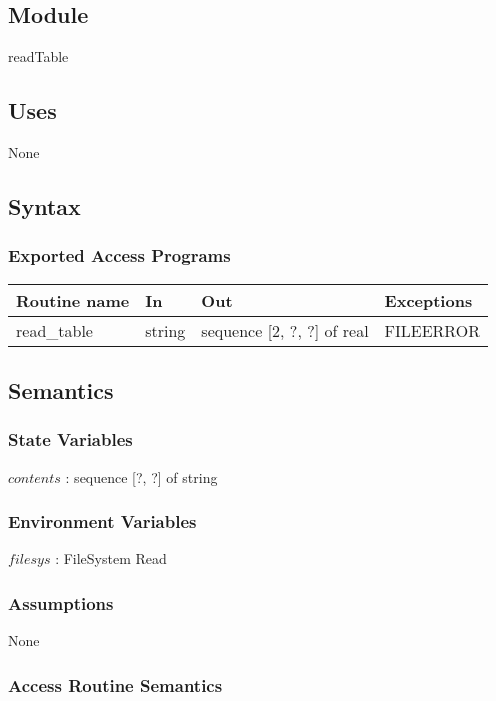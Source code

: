 \documentclass[12pt,fleqn]{article}
\begin{document}
\subsection*{Module}

readTable

\subsection* {Uses}

None

\subsection* {Syntax}

\subsubsection* {Exported Access Programs}

\begin{tabular}{| l | l | l | l |}
\hline
\textbf{Routine name} & \textbf{In} & \textbf{Out} & \textbf{Exceptions}\\
\hline
read\_table & string & sequence [2, ?, ?] of real & FILEERROR\\
\hline

\end{tabular}

\subsection* {Semantics}

\subsubsection* {State Variables}
$contents$ : sequence [?, ?] of string

\subsubsection* {Environment Variables}
$filesys$ : FileSystem Read

\subsubsection* {Assumptions}
None

\subsubsection* {Access Routine Semantics}
\end{document}
